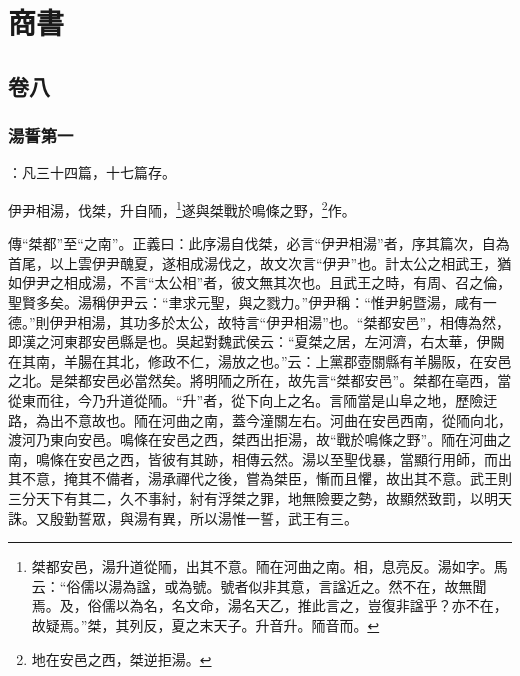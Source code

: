 


\part{商書}


\chapter{卷八}


\section{湯誓第一}


 {\noindent\zhuan{}\fzbyks {}：凡三十四篇，十七篇存。\par}

伊尹相湯，伐桀，升自陑，\footnote{桀都安邑，湯升道從陑，出其不意。陑在河曲之南。相，息亮反。湯如字。馬云：“俗儒以湯為諡，或為號。號者似非其意，言諡近之。然不在，故無聞焉。及，俗儒以為名，名文命，湯名天乙，推此言之，豈復非諡乎？亦不在，故疑焉。”桀，其列反，夏之末天子。升音升。陑音而。}遂與桀戰於鳴條之野，\footnote{地在安邑之西，桀逆拒湯。}作。


{\noindent\zhuan{}\fzbyks 傳“桀都”至“之南”。正義曰：此序湯自伐桀，必言“伊尹相湯”者，序其篇次，自為首尾，以上雲伊尹醜夏，遂相成湯伐之，故文次言“伊尹”也。計太公之相武王，猶如伊尹之相成湯，不言“太公相”者，彼文無其次也。且武王之時，有周、召之倫，聖賢多矣。湯稱伊尹云：“聿求元聖，與之戮力。”伊尹稱：“惟尹躬暨湯，咸有一德。”則伊尹相湯，其功多於太公，故特言“伊尹相湯”也。“桀都安邑”，相傳為然，即漢之河東郡安邑縣是也。吳起對魏武侯云：“夏桀之居，左河濟，右太華，伊闕在其南，羊腸在其北，修政不仁，湯放之也。”云：上黨郡壺關縣有羊腸阪，在安邑之北。是桀都安邑必當然矣。將明陑之所在，故先言“桀都安邑”。桀都在亳西，當從東而往，今乃升道從陑。“升”者，從下向上之名。言陑當是山阜之地，歷險迂路，為出不意故也。陑在河曲之南，蓋今潼關左右。河曲在安邑西南，從陑向北，渡河乃東向安邑。鳴條在安邑之西，桀西出拒湯，故“戰於鳴條之野”。陑在河曲之南，鳴條在安邑之西，皆彼有其跡，相傳云然。湯以至聖伐暴，當顯行用師，而出其不意，掩其不備者，湯承禪代之後，嘗為桀臣，慚而且懼，故出其不意。武王則三分天下有其二，久不事紂，紂有浮桀之罪，地無險要之勢，故顯然致罰，以明天誅。又殷勤誓眾，與湯有異，所以湯惟一誓，武王有三。 \par}

